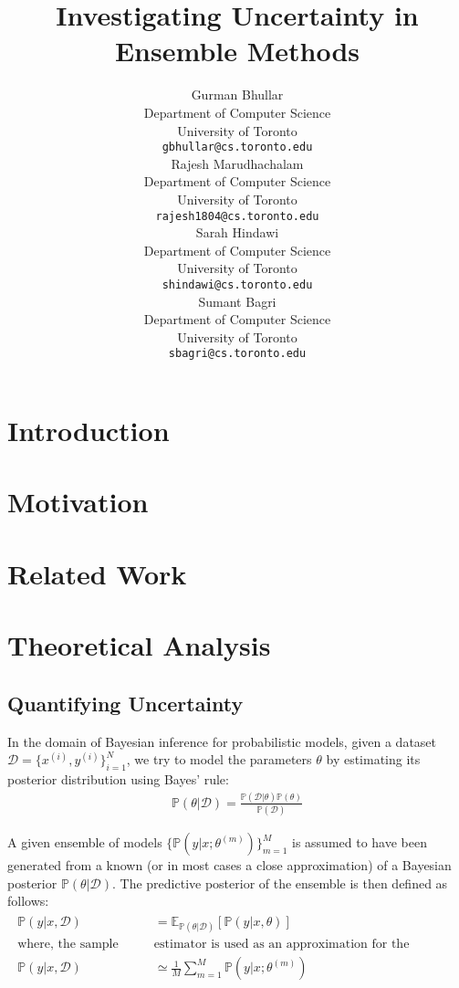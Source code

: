 \documentclass{article}
\title{Investigating Uncertainty in Ensemble Methods}
\author{%
  Gurman Bhullar \\
  Department of Computer Science \\
  University of Toronto \\
  \texttt{gbhullar@cs.toronto.edu} \\
  \And
  Rajesh Marudhachalam \\
  Department of Computer Science \\
  University of Toronto \\
  \texttt{rajesh1804@cs.toronto.edu} \\
  \And
  Sarah Hindawi \\
  Department of Computer Science \\
  University of Toronto \\
  \texttt{shindawi@cs.toronto.edu} \\
  \And
  Sumant Bagri \\
  Department of Computer Science \\
  University of Toronto \\
  \texttt{sbagri@cs.toronto.edu} \\
}
\begin{document}
\maketitle


\begin{abstract}
\end{abstract}


\section{Introduction}


\section{Motivation}


\section{Related Work}


\section{Theoretical Analysis}

\subsection{Quantifying Uncertainty}

In the domain of Bayesian inference for probabilistic models, given a dataset $\mathcal{D} = \{ x^{(i)}, y^{(i)}\}_{i=1}^N$, we try to model the parameters $\theta$ by estimating its posterior distribution using Bayes' rule:
\begin{align}
	\mathbb{P}(\theta|\mathcal{D}) = \frac{\mathbb{P}(\mathcal{D} | \theta)\mathbb{P}(\theta)}{\mathbb{P}(\mathcal{D})}
\end{align}

A given ensemble of models $\{ \mathbb{P}(y|x; \theta^{(m)}) \}_{m=1}^M$ is assumed to have been generated from a known (or in most cases a close approximation) of a Bayesian posterior $\mathbb{P}(\theta|\mathcal{D})$. The predictive posterior of the ensemble is then defined as follows:
\begin{align}
	\begin{split}
		\mathbb{P}(y|x, \mathcal{D}) &= \mathbb{E}_{\mathbb{P}(\theta|\mathcal{D})} \left[ \mathbb{P}(y|x,\theta) \right] \\
		\text{where, the sample mean}  &\text{estimator is used as an approximation for the expectation} \\
		\mathbb{P}(y|x, \mathcal{D}) &\simeq \frac{1}{M} \sum\limits_{m=1}^M \mathbb{P}(y|x; \theta^{(m)}) \\
	\end{split}
\end{align}
\end{document}
